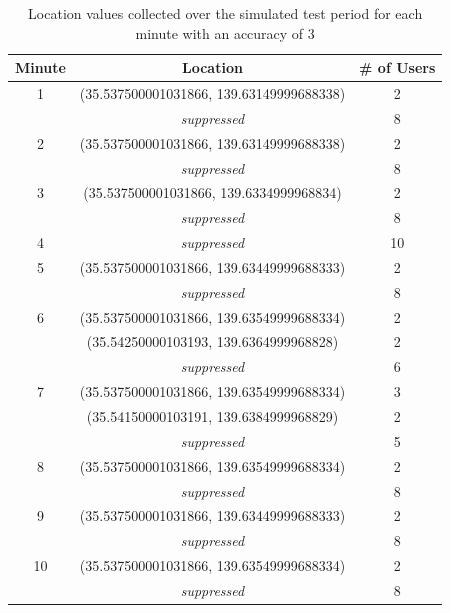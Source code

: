 \begin{table}[htbp]
    \centering
    \begin{tabular}{|c|c|c|} 
        \hline
        \textbf{Minute} & \textbf{Location} & \textbf{\# of Users}\\ [0.5ex] 
        \hline
        1 & (35.537500001031866, 139.63149999688338) & 2 \\ 
        &\textit{suppressed} & 8 \\ 
        \hline
        2 & (35.537500001031866, 139.63149999688338) & 2 \\ 
        &\textit{suppressed} & 8 \\ 
        \hline
        3 & (35.537500001031866, 139.6334999968834) & 2 \\ 
        &\textit{suppressed} & 8 \\ 
        \hline
        4 & \textit{suppressed} & 10 \\
        \hline
        5 & (35.537500001031866, 139.63449999688333) & 2 \\ 
        &\textit{suppressed} & 8 \\ 
        \hline
        6 & (35.537500001031866, 139.63549999688334) & 2 \\ 
        & (35.54250000103193, 139.6364999968828) & 2 \\ 
        &\textit{suppressed} & 6\\
        \hline
        7 & (35.537500001031866, 139.63549999688334) & 3 \\ 
        & (35.54150000103191, 139.6384999968829) & 2 \\ 
        &\textit{suppressed} & 5\\ 
        \hline
        8 & (35.537500001031866, 139.63549999688334) & 2 \\ 
        &\textit{suppressed} & 8 \\ 
        \hline
        9 & (35.537500001031866, 139.63449999688333) & 2 \\ 
        &\textit{suppressed} & 8 \\ 
        \hline
        10 & (35.537500001031866, 139.63549999688334) & 2 \\ 
        &\textit{suppressed} & 8 \\ 
        \hline
    \end{tabular}
    \caption{Location values collected over the simulated test period for each minute with an accuracy of 3}
    \label{tab:location_sim3}
\end{table}


